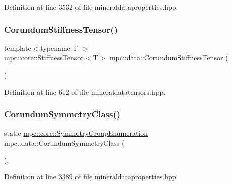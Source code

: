 Definition at line 3532 of file mineraldataproperties.\+hpp.

\mbox{\label{namespacempc_1_1data_a140a8fa7fc4964a20a6887ba6be7a650}} 
\subsubsection{\texorpdfstring{Corundum\+Stiffness\+Tensor()}{CorundumStiffnessTensor()}}
{\footnotesize\ttfamily template$<$typename T $>$ \\
\mbox{\hyperlink{structmpc_1_1core_1_1_stiffness_tensor}{mpc\+::core\+::\+Stiffness\+Tensor}}$<$T$>$ mpc\+::data\+::\+Corundum\+Stiffness\+Tensor (\begin{DoxyParamCaption}{ }\end{DoxyParamCaption})}



Definition at line 612 of file mineraldatatensors.\+hpp.

\mbox{\label{namespacempc_1_1data_abc3b6f42a9d1f955584819d27b0ac35d}} 
\subsubsection{\texorpdfstring{Corundum\+Symmetry\+Class()}{CorundumSymmetryClass()}}
{\footnotesize\ttfamily static \mbox{\hyperlink{namespacempc_1_1core_a9d979684062547055a0ef5c13077bad8}{mpc\+::core\+::\+Symmetry\+Group\+Enumeration}} mpc\+::data\+::\+Corundum\+Symmetry\+Class (\begin{DoxyParamCaption}{ }\end{DoxyParamCaption})\hspace{0.3cm}{\ttfamily [inline]}, {\ttfamily [static]}}



Definition at line 3389 of file mineraldataproperties.\+hpp.

\mbox{\label{namespacempc_1_1data_ac918dcf9bc6460fb502245d3726529f2}} 
